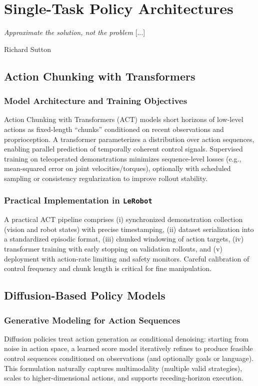 \section{Single-Task Policy Architectures}
\label{sec:single}

\epigraph{\textit{Approximate the solution, not the problem} [...]}{Richard Sutton}

\subsection{Action Chunking with Transformers}
\subsubsection{Model Architecture and Training Objectives}
Action Chunking with Transformers (ACT) models short horizons of low-level actions as fixed-length ``chunks'' conditioned on recent observations and proprioception. A transformer parameterizes a distribution over action sequences, enabling parallel prediction of temporally coherent control signals. Supervised training on teleoperated demonstrations minimizes sequence-level losses (e.g., mean-squared error on joint velocities/torques), optionally with scheduled sampling or consistency regularization to improve rollout stability.

\subsubsection{Practical Implementation in \texttt{LeRobot}}
A practical ACT pipeline comprises (i) synchronized demonstration collection (vision and robot states) with precise timestamping, (ii) dataset serialization into a standardized episodic format, (iii) chunked windowing of action targets, (iv) transformer training with early stopping on validation rollouts, and (v) deployment with action-rate limiting and safety monitors. Careful calibration of control frequency and chunk length is critical for fine manipulation.

\subsection{Diffusion-Based Policy Models}
\subsubsection{Generative Modeling for Action Sequences}
Diffusion policies treat action generation as conditional denoising: starting from noise in action space, a learned score model iteratively refines to produce feasible control sequences conditioned on observations (and optionally goals or language). This formulation naturally captures multimodality (multiple valid strategies), scales to higher-dimensional actions, and supports receding-horizon execution.

